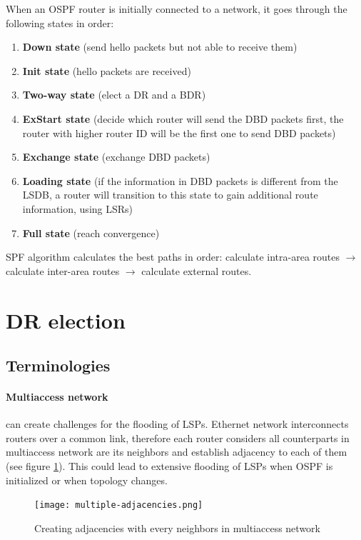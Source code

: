 When an OSPF router is initially connected to a network, it goes through the following states in order:
\begin{enumerate}
\item \textbf{Down state} (send hello packets but not able to receive them)
\item \textbf{Init state} (hello packets are received)
\item \textbf{Two-way state} (elect a DR and a BDR)
\item \textbf{ExStart state} (decide which router will send the DBD packets first, the router with higher router ID will be the first one to send DBD packets)%
\item \textbf{Exchange state} (exchange DBD packets)
\item \textbf{Loading state} (if the information in DBD packets is different from the LSDB, a router will transition to this state to gain additional route information, using LSRs)
\item \textbf{Full state} (reach convergence)
\end{enumerate}

SPF algorithm calculates the best paths in order: calculate intra-area routes $\rightarrow$ calculate inter-area routes $\rightarrow$ calculate external routes.

\section{DR election}

\subsection{Terminologies}

\paragraph{Multiaccess network} can create challenges for the flooding of LSPs. Ethernet network interconnects routers over a common link, therefore each router considers all counterparts in multiaccess network are its neighbors and establish adjacency to each of them (see figure \ref{multiple-adjacencies}). This could lead to extensive flooding of LSPs when OSPF is initialized or when topology changes.

\begin{figure}[hbtp]
\centering
\texttt{[image: multiple-adjacencies.png]} 
\caption{Creating adjacencies with every neighbors in multiaccess network}
\label{multiple-adjacencies}
\end{figure}
	
